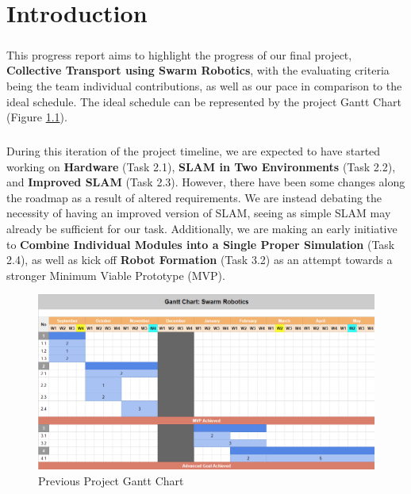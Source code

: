 \chapter{Introduction}

\paragraph*{}
This progress report aims to highlight the progress of our final project, \textbf{Collective Transport using Swarm Robotics}, with the evaluating criteria being the team individual contributions, as well as our pace in comparison to the ideal schedule. The ideal schedule can be represented by the project Gantt Chart (Figure \ref{fig:gantt_chart}).

\paragraph*{}
During this iteration of the project timeline, we are expected to have started working on \textbf{Hardware} (Task 2.1), \textbf{SLAM in Two Environments} (Task 2.2), and \textbf{Improved SLAM} (Task 2.3). However, there have been some changes along the roadmap as a result of altered requirements. We are instead debating the necessity of having an improved version of SLAM, seeing as simple SLAM may already be sufficient for our task. Additionally, we are making an early initiative to \textbf{Combine Individual Modules into a Single Proper Simulation} (Task 2.4), as well as kick off \textbf{Robot Formation} (Task 3.2) as an attempt towards a stronger Minimum Viable Prototype (MVP).

\begin{figure}[H]
    \centering
    \includegraphics[width=1\linewidth]{assets/images/introduction/gantt_chart.png}
    \caption{Previous Project Gantt Chart}
    \label{fig:gantt_chart}
\end{figure}

